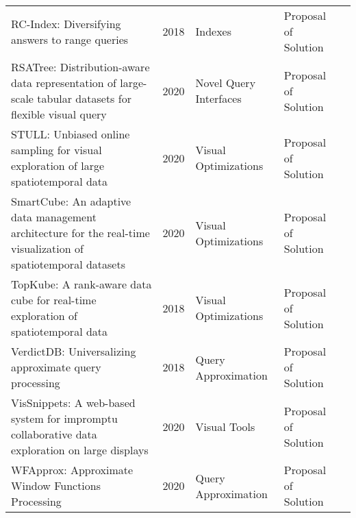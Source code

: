 \begin{longtable}{p{18em} l l l l}
{RC}-{Index}: {Diversifying} answers to range queries & 2018 & Indexes & Proposal of Solution & \cite{10.14778/3192965.3192969}\\ 
{RSATree}: {Distribution}-aware data representation of large-scale tabular datasets for flexible visual query & 2020 & Novel Query Interfaces & Proposal of Solution & \cite{8807303}\\ 
{STULL}: {Unbiased} online sampling for visual exploration of large spatiotemporal data & 2020 & Visual Optimizations & Proposal of Solution & \cite{9308629}\\ 
{SmartCube}: {An} adaptive data management architecture for the real-time visualization of spatiotemporal datasets & 2020 & Visual Optimizations & Proposal of Solution & \cite{8809847}\\ 
{TopKube}: {A} rank-aware data cube for real-time exploration of spatiotemporal data & 2018 & Visual Optimizations & Proposal of Solution & \cite{7858782}\\ 
{VerdictDB}: {Universalizing} approximate query processing & 2018 & Query Approximation & Proposal of Solution & \cite{10.1145/3183713.3196905}\\ 
{VisSnippets}: {A} web-based system for impromptu collaborative data exploration on large displays & 2020 & Visual Tools & Proposal of Solution & \cite{10.1145/3311790.3396666}\\ 
{WFApprox}: {Approximate} {Window} {Functions} {Processing} & 2020 & Query Approximation & Proposal of Solution & \cite{lin_wfapprox_2020}\\ 
\end{longtable}

\restoregeometry
\printbibliography[heading=none]
